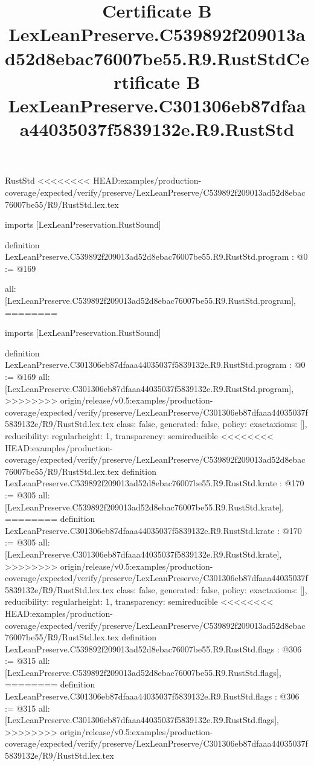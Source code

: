 \begin{lexlean}{RustStd}
<<<<<<<< HEAD:examples/production-coverage/expected/verify/preserve/LexLeanPreserve/C539892f209013ad52d8ebac76007be55/R9/RustStd.lex.tex
\title{Certificate B LexLeanPreserve.C539892f209013ad52d8ebac76007be55.R9.RustStd}
\begin{coremodule}
imports [LexLeanPreservation.RustSound]

definition LexLeanPreserve.C539892f209013ad52d8ebac76007be55.R9.RustStd.program : @0 := @169 {
  all: [LexLeanPreserve.C539892f209013ad52d8ebac76007be55.R9.RustStd.program],
========
\title{Certificate B LexLeanPreserve.C301306eb87dfaaa44035037f5839132e.R9.RustStd}
\begin{coremodule}
imports [LexLeanPreservation.RustSound]

definition LexLeanPreserve.C301306eb87dfaaa44035037f5839132e.R9.RustStd.program : @0 := @169 {
  all: [LexLeanPreserve.C301306eb87dfaaa44035037f5839132e.R9.RustStd.program],
>>>>>>>> origin/release/v0.5:examples/production-coverage/expected/verify/preserve/LexLeanPreserve/C301306eb87dfaaa44035037f5839132e/R9/RustStd.lex.tex
  class: false,
  generated: false,
  policy: exact{axioms: []},
  reducibility: regular{height: 1},
  transparency: semireducible
}
<<<<<<<< HEAD:examples/production-coverage/expected/verify/preserve/LexLeanPreserve/C539892f209013ad52d8ebac76007be55/R9/RustStd.lex.tex
definition LexLeanPreserve.C539892f209013ad52d8ebac76007be55.R9.RustStd.krate : @170 := @305 {
  all: [LexLeanPreserve.C539892f209013ad52d8ebac76007be55.R9.RustStd.krate],
========
definition LexLeanPreserve.C301306eb87dfaaa44035037f5839132e.R9.RustStd.krate : @170 := @305 {
  all: [LexLeanPreserve.C301306eb87dfaaa44035037f5839132e.R9.RustStd.krate],
>>>>>>>> origin/release/v0.5:examples/production-coverage/expected/verify/preserve/LexLeanPreserve/C301306eb87dfaaa44035037f5839132e/R9/RustStd.lex.tex
  class: false,
  generated: false,
  policy: exact{axioms: []},
  reducibility: regular{height: 1},
  transparency: semireducible
}
<<<<<<<< HEAD:examples/production-coverage/expected/verify/preserve/LexLeanPreserve/C539892f209013ad52d8ebac76007be55/R9/RustStd.lex.tex
definition LexLeanPreserve.C539892f209013ad52d8ebac76007be55.R9.RustStd.flags : @306 := @315 {
  all: [LexLeanPreserve.C539892f209013ad52d8ebac76007be55.R9.RustStd.flags],
========
definition LexLeanPreserve.C301306eb87dfaaa44035037f5839132e.R9.RustStd.flags : @306 := @315 {
  all: [LexLeanPreserve.C301306eb87dfaaa44035037f5839132e.R9.RustStd.flags],
>>>>>>>> origin/release/v0.5:examples/production-coverage/expected/verify/preserve/LexLeanPreserve/C301306eb87dfaaa44035037f5839132e/R9/RustStd.lex.tex
}}}
\end{coremodule}}
\end{coremodule}
\end{lexlean}

